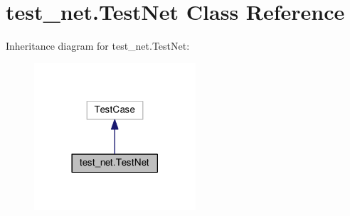 \hypertarget{classtest__net_1_1_test_net}{}\section{test\+\_\+net.\+Test\+Net Class Reference}
\label{classtest__net_1_1_test_net}


Inheritance diagram for test\+\_\+net.\+Test\+Net\+:
\nopagebreak
\begin{figure}[H]
\begin{center}
\leavevmode
\includegraphics[width=170pt]{classtest__net_1_1_test_net__inherit__graph}
\end{center}
\end{figure}
